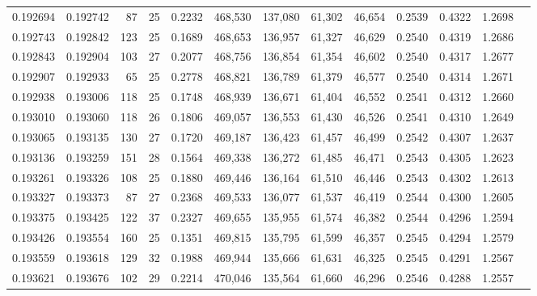 \begin{tabular}{rrrrrrrrrrrrr}
0.192694 & 0.192742 &  87 &  25 &                                     0.2232 & 468,530 & 137,080 &  61,302 &  46,654 & 0.2539 & 0.4322 & 1.2698 \\
0.192743 & 0.192842 & 123 &  25 &                                     0.1689 & 468,653 & 136,957 &  61,327 &  46,629 & 0.2540 & 0.4319 & 1.2686 \\
0.192843 & 0.192904 & 103 &  27 &                                     0.2077 & 468,756 & 136,854 &  61,354 &  46,602 & 0.2540 & 0.4317 & 1.2677 \\
0.192907 & 0.192933 &  65 &  25 &                                     0.2778 & 468,821 & 136,789 &  61,379 &  46,577 & 0.2540 & 0.4314 & 1.2671 \\
0.192938 & 0.193006 & 118 &  25 &                                     0.1748 & 468,939 & 136,671 &  61,404 &  46,552 & 0.2541 & 0.4312 & 1.2660 \\
0.193010 & 0.193060 & 118 &  26 &                                     0.1806 & 469,057 & 136,553 &  61,430 &  46,526 & 0.2541 & 0.4310 & 1.2649 \\
0.193065 & 0.193135 & 130 &  27 &                                     0.1720 & 469,187 & 136,423 &  61,457 &  46,499 & 0.2542 & 0.4307 & 1.2637 \\
0.193136 & 0.193259 & 151 &  28 &                                     0.1564 & 469,338 & 136,272 &  61,485 &  46,471 & 0.2543 & 0.4305 & 1.2623 \\
0.193261 & 0.193326 & 108 &  25 &                                     0.1880 & 469,446 & 136,164 &  61,510 &  46,446 & 0.2543 & 0.4302 & 1.2613 \\
0.193327 & 0.193373 &  87 &  27 &                                     0.2368 & 469,533 & 136,077 &  61,537 &  46,419 & 0.2544 & 0.4300 & 1.2605 \\
0.193375 & 0.193425 & 122 &  37 &                                     0.2327 & 469,655 & 135,955 &  61,574 &  46,382 & 0.2544 & 0.4296 & 1.2594 \\
0.193426 & 0.193554 & 160 &  25 &                                     0.1351 & 469,815 & 135,795 &  61,599 &  46,357 & 0.2545 & 0.4294 & 1.2579 \\
0.193559 & 0.193618 & 129 &  32 &                                     0.1988 & 469,944 & 135,666 &  61,631 &  46,325 & 0.2545 & 0.4291 & 1.2567 \\
0.193621 & 0.193676 & 102 &  29 &                                     0.2214 & 470,046 & 135,564 &  61,660 &  46,296 & 0.2546 & 0.4288 & 1.2557 \\

\end{tabular}
